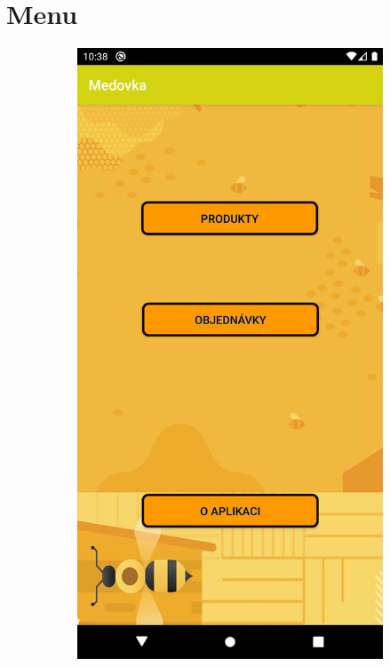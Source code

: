 \documentclass[12pt]{report}
\begin{document}
\section{Menu}
%
\begin{figure}[H]
	\centering
	\begin{subfigure}{.3\textwidth}
	  \centering
	  \includegraphics[width=\textwidth]{img/main_window.png}

\end{subfigure}
\end{figure}
\end{document}
